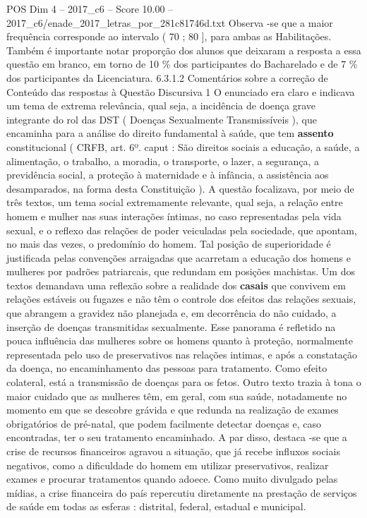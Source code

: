 \begin{textsample}{POS Dim 4 – 2017\_c6 – Score 10.00 – 2017\_c6/enade\_2017\_letras\_por\_281c81746d.txt}
Observa -se que a maior frequência corresponde ao intervalo ( 70 ; 80 ], para ambas as Habilitações.
Também é importante notar proporção dos alunos que deixaram a resposta a essa questão em branco, em torno de 10 \% dos participantes do Bacharelado e de 7 \% dos participantes da Licenciatura. 6.3.1.2 Comentários sobre a correção de Conteúdo das respostas à Questão Discursiva 1 O enunciado era claro e indicava um tema de extrema relevância, qual seja, a incidência de doença grave integrante do rol das DST ( Doenças Sexualmente Transmissíveis ), que encaminha para a análise do direito fundamental à saúde, que tem \textbf{assento} constitucional ( CRFB, art. 6º. caput : São direitos sociais a educação, a saúde, a alimentação, o trabalho, a moradia, o transporte, o lazer, a segurança, a previdência social, a proteção à maternidade e à infância, a assistência aos desamparados, na forma desta Constituição ).
A questão focalizava, por meio de três textos, um tema social extremamente relevante, qual seja, a relação entre homem e mulher nas suas interações íntimas, no caso representadas pela vida sexual, e o reflexo das relações de poder veiculadas pela sociedade, que apontam, no mais das vezes, o predomínio do homem.
Tal posição de superioridade é justificada pelas convenções arraigadas que acarretam a educação dos homens e mulheres por padrões patriarcais, que redundam em posições machistas.
Um dos textos demandava uma reflexão sobre a realidade dos \textbf{casais} que convivem em relações estáveis ou fugazes e não têm o controle dos efeitos das relações sexuais, que abrangem a gravidez não planejada e, em decorrência do não cuidado, a inserção de doenças transmitidas sexualmente.
Esse panorama é refletido na pouca influência das mulheres sobre os homens quanto à proteção, normalmente representada pelo uso de preservativos nas relações intimas, e após a constatação da doença, no encaminhamento das pessoas para tratamento.
Como efeito colateral, está a transmissão de doenças para os fetos.
Outro texto trazia à tona o maior cuidado que as mulheres têm, em geral, com sua saúde, notadamente no momento em que se descobre grávida e que redunda na realização de exames obrigatórios de pré-natal, que podem facilmente detectar doenças e, caso encontradas, ter o seu tratamento encaminhado.
A par disso, destaca -se que a crise de recursos financeiros agravou a situação, que já recebe influxos sociais negativos, como a dificuldade do homem em utilizar preservativos, realizar exames e procurar tratamentos quando adoece.
Como muito divulgado pelas mídias, a crise financeira do país repercutiu diretamente na prestação de serviços de saúde em todas as esferas : distrital, federal, estadual e municipal.

\end{textsample}
